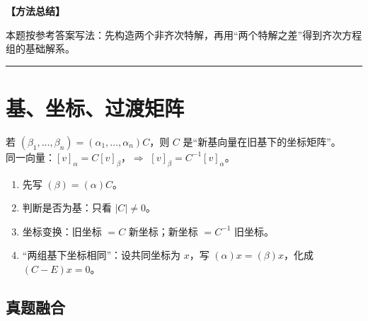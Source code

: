 ﻿\documentclass[11pt,a4paper,UTF8]{ctexart}
\begin{document}
\begin{answerbox}
\textbf{【方法总结】}

本题按参考答案写法：先构造两个非齐次特解，再用“两个特解之差”得到齐次方程组的基础解系。
\end{answerbox}
\bigskip\hrule\bigskip

\section{基、坐标、过渡矩阵}

\begin{identifybox}[高亮公式]
若 $(\beta_1,\ldots,\beta_n)=(\alpha_1,\ldots,\alpha_n)C$，则 $C$ 是“新基向量在旧基下的坐标矩阵”。\\
同一向量：$[v]_\alpha=C[v]_\beta$，$\Rightarrow$ $[v]_\beta=C^{-1}[v]_\alpha$。\\
\end{identifybox}

\begin{templatebox}[考场模板]

\begin{enumerate}
\item 先写 $(\beta)=(\alpha)C$。
\item 判断是否为基：只看 $|C|\ne0$。
\item 坐标变换：旧坐标 $=C$ 新坐标；新坐标 $=C^{-1}$ 旧坐标。
\item “两组基下坐标相同”：设共同坐标为 $x$，写 $(\alpha)x=(\beta)x$，化成 $(C-E)x=0$。
\end{enumerate}

\end{templatebox}
\subsection{真题融合}
\end{document}
